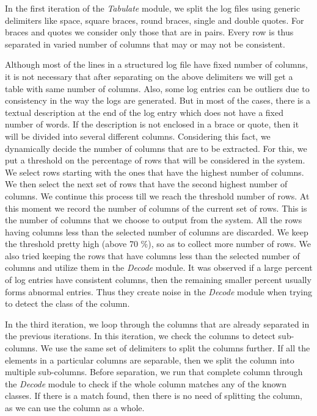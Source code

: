 In the first iteration of the \textit{Tabulate} module, we split the log files using generic delimiters like space, square braces, round braces, single and double quotes. For braces and quotes we consider only those that are in pairs. Every row is thus separated in varied number of columns that may or may not be consistent. 

Although most of the lines in a structured log file have fixed number of columns, it is not necessary that after separating on the above delimiters we will get a table with same number of columns. Also, some log entries can be outliers due to consistency in the way the logs are generated. But in most of the cases, there is a textual description at the end of the log entry which does not have a fixed number of words. If the description is not enclosed in a brace or quote, then it will be divided into several different columns. Considering this fact, we dynamically decide the number of columns that are to be extracted. For this, we put a threshold on the percentage of rows that will be considered in the system. We select rows starting with the ones that have the highest number of columns. We then select the next set of rows that have the second highest number of columns. We continue this process till we reach the threshold number of rows. At this moment we record the number of columns of the current set of rows. This is the number of columns that we choose to output from the system. All the rows having columns less than the selected number of columns are discarded. We keep the threshold pretty high (above 70 \%), so as to collect more number of rows. We also tried keeping the rows that have columns less than the selected number of columns and utilize them in the \textit{Decode} module. It was observed if a large percent of log entries have consistent columns, then the remaining smaller percent usually forms abnormal entries. Thus they create noise in the \textit{Decode} module when trying to detect the class of the column.

In the third iteration, we loop through the columns that are already separated in the previous iterations. In this iteration, we check the columns to detect sub-columns. We use the same set of delimiters to split the columns further. If all the elements in a particular columns are separable, then we split the column into multiple sub-columns. Before separation, we run that complete column through the \textit{Decode} module to check if the whole column matches any of the known classes. If there is a match found, then there is no need of splitting the column, as we can use the column as a whole.


